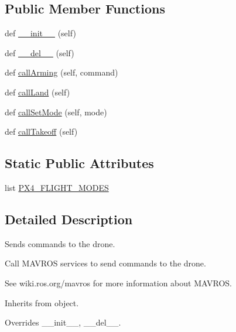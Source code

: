\subsection*{Public Member Functions}
\begin{DoxyCompactItemize}
\item 
def \mbox{\hyperlink{classwindshape_1_1drone_1_1fcu_1_1_m_a_v_r_o_s_client_1_1_m_a_v_r_o_s_client_aa2be00cbb644eddab16ac0b9bde01e01}{\+\_\+\+\_\+init\+\_\+\+\_\+}} (self)
\item 
def \mbox{\hyperlink{classwindshape_1_1drone_1_1fcu_1_1_m_a_v_r_o_s_client_1_1_m_a_v_r_o_s_client_ab7a2c00705a4818432ab65934cf191b1}{\+\_\+\+\_\+del\+\_\+\+\_\+}} (self)
\item 
def \mbox{\hyperlink{classwindshape_1_1drone_1_1fcu_1_1_m_a_v_r_o_s_client_1_1_m_a_v_r_o_s_client_a7ccde40ffe0ec0eb71d096c8b2a75dbd}{call\+Arming}} (self, command)
\item 
def \mbox{\hyperlink{classwindshape_1_1drone_1_1fcu_1_1_m_a_v_r_o_s_client_1_1_m_a_v_r_o_s_client_ac77f4239dbb70c88ed3bf45967b35fc0}{call\+Land}} (self)
\item 
def \mbox{\hyperlink{classwindshape_1_1drone_1_1fcu_1_1_m_a_v_r_o_s_client_1_1_m_a_v_r_o_s_client_a45ddb81a76860f822dbfc21e2bacd82f}{call\+Set\+Mode}} (self, mode)
\item 
def \mbox{\hyperlink{classwindshape_1_1drone_1_1fcu_1_1_m_a_v_r_o_s_client_1_1_m_a_v_r_o_s_client_a671bf2248dd98c3ecef4f6fd8348b099}{call\+Takeoff}} (self)
\end{DoxyCompactItemize}
\subsection*{Static Public Attributes}
\begin{DoxyCompactItemize}
\item 
list \mbox{\hyperlink{classwindshape_1_1drone_1_1fcu_1_1_m_a_v_r_o_s_client_1_1_m_a_v_r_o_s_client_abe3ff6179ff5fb0a038f5f8c2b7728cb}{P\+X4\+\_\+\+F\+L\+I\+G\+H\+T\+\_\+\+M\+O\+D\+ES}}
\end{DoxyCompactItemize}


\subsection{Detailed Description}
\begin{DoxyVerb}Sends commands to the drone.

Call MAVROS services to send commands to the drone.

See wiki.ros.org/mavros for more information about MAVROS.

Inherits from object.

Overrides __init__, __del__.
\end{DoxyVerb}
 

